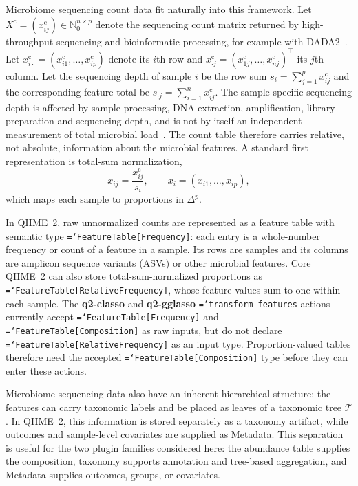 \documentclass[11pt,a4paper]{article}
\newcommand{\code}[1]{\allowbreak\texttt{\hyphenchar\font=`\-\relax #1}}
\newcommand{\pkg}[1]{\textbf{#1}}
\newcommand{\simplex}{\Delta}
\begin{document}
Microbiome sequencing count data fit naturally into this framework. Let
$X^{\mathrm{c}}=(x^{\mathrm{c}}_{ij})\in\mathbb{N}_0^{n\times p}$ denote the
sequencing count matrix returned by high-throughput sequencing and
bioinformatic processing, for example with DADA2~\citep{callahan2016dada2}.
Let $x^{\mathrm{c}}_{i\cdot}=(x^{\mathrm{c}}_{i1},\ldots,x^{\mathrm{c}}_{ip})$
denote its $i$th row and
$x^{\mathrm{c}}_{\cdot j}=(x^{\mathrm{c}}_{1j},\ldots,x^{\mathrm{c}}_{nj})^\top$
its $j$th column. Let the sequencing depth of sample $i$ be the row sum
$s_i=\sum_{j=1}^{p}x^{\mathrm{c}}_{ij}$ and the corresponding feature total be
$s_{\cdot j}=\sum_{i=1}^{n}x^{\mathrm{c}}_{ij}$.
The sample-specific sequencing depth is affected by sample processing,
DNA extraction, amplification, library preparation and sequencing depth, and is
not by itself an independent measurement of total microbial
load~\citep{vandeputte2017quantitative,tkacz2018absolute}. The count table
therefore carries relative, not absolute, information about the microbial
features. A standard first representation is total-sum normalization,
\begin{equation}
\label{eq:total-sum-normalization}
x_{ij} = \frac{x^{\mathrm{c}}_{ij}}{s_i},
\qquad
x_i=(x_{i1},\ldots,x_{ip}),
\end{equation}
which maps each sample to proportions in $\simplex^p$.

In QIIME~2, raw unnormalized counts are represented as a feature table
with semantic type \code{FeatureTable[Frequency]}: each entry is a whole-number
frequency or count of a feature in a sample. Its rows are samples and its columns
are amplicon sequence variants (ASVs) or other microbial features. Core QIIME~2 can also
store total-sum-normalized proportions as \code{FeatureTable[RelativeFrequency]},
whose feature values sum to one within each sample. The \pkg{q2-classo} and
\pkg{q2-gglasso} \code{transform-features} actions currently accept
\code{FeatureTable[Frequency]} and \code{FeatureTable[Composition]} as raw
inputs, but do not declare \code{FeatureTable[RelativeFrequency]} as an input
type. Proportion-valued tables therefore need the accepted
\code{FeatureTable[Composition]} type before they can enter these actions.

Microbiome sequencing data also have an inherent hierarchical structure: the
features can carry taxonomic labels and be placed as leaves of a taxonomic tree
$\mathcal{T}$. In QIIME~2, this information is stored separately as a taxonomy
artifact, while outcomes and sample-level covariates are supplied as Metadata.
This separation is useful for the two plugin families considered here: the
abundance table supplies the composition, taxonomy supports annotation and
tree-based aggregation, and Metadata supplies outcomes, groups, or covariates.
\end{document}
